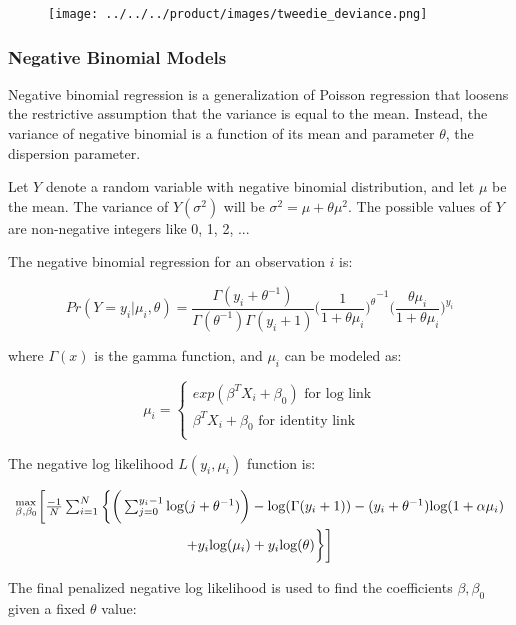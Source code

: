 \begin{figure}[H]
\centering
\texttt{[image: ../../../product/images/tweedie\_deviance.png]}
\end{figure}
   
\subsubsection{Negative Binomial Models}

Negative binomial regression is a generalization of Poisson regression that loosens the restrictive assumption that the variance is equal to the mean. Instead, the variance of negative binomial is a function of its mean and parameter $\theta$, the dispersion parameter. 

Let $Y$ denote a random variable with negative binomial distribution, and let $\mu$ be the mean. The variance of $Y (\sigma^2)$ will be $\sigma^2 = \mu + \theta\mu^2$. The possible values of $Y$ are non-negative integers like 0, 1, 2, ...

The negative binomial regression for an observation $i$ is:

$$Pr(Y = y_i|\mu_i, \theta) = \frac{\Gamma(y_i+\theta^{-1})}{\Gamma(\theta^{-1})\Gamma(y_i+1)} {\bigg(\frac {1} {1 + {\theta {\mu_i}}}\bigg) ^\theta}^{-1} { \bigg(\frac {{\theta {\mu_i}}} {1 + {\theta {\mu_i}}} \bigg) ^{y_i}}$$

where $\Gamma(x)$ is the gamma function, and $\mu_i$ can be modeled as:

$$ \mu_i=\left\{
                \begin{array}{ll}
                  exp (\beta^T X_i + \beta_0) \text{  for log link}\\
                  \beta^T X_i + \beta_0 \text{  for identity link}\\
                \end{array}
              \right. $$

The  negative log likelihood $L(y_i,\mu_i)$ function is:

\begin{multline*}
$$^\text{max}_{\beta,\beta_0} \bigg[ \frac{-1}{N} \sum_{i=1}^{N}  \bigg \{ \bigg( \sum_{j=0}^{y_i-1} \text{log}(j + \theta^{-1} ) \bigg) - \text{log} (\Gamma (y_i + 1)) - (y_i + \theta^{-1}) \text{log} (1 + \alpha\mu_i) \\
+ y_i \text{log}(\mu_i) + y_i \text{log} (\theta) \bigg \} \bigg]$$
\end{multline*}

The final penalized negative log likelihood is used to find the coefficients $\beta, \beta_0$ given a fixed $\theta$ value:

